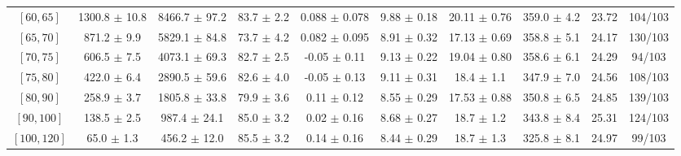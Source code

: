 \begin{tabular}{c||c|c|c|c|c|c|c||c|c}
$[60, 65]$ & 1300.8 $\pm$ 10.8 & 8466.7 $\pm$ 97.2 & 83.7 $\pm$ 2.2 & 0.088 $\pm$ 0.078 & 9.88 $\pm$ 0.18 & 20.11 $\pm$ 0.76 & 359.0 $\pm$ 4.2 & 23.72 & 104/103\\
$[65, 70]$ & 871.2 $\pm$ 9.9 & 5829.1 $\pm$ 84.8 & 73.7 $\pm$ 4.2 & 0.082 $\pm$ 0.095 & 8.91 $\pm$ 0.32 & 17.13 $\pm$ 0.69 & 358.8 $\pm$ 5.1 & 24.17 & 130/103\\
$[70, 75]$ & 606.5 $\pm$ 7.5 & 4073.1 $\pm$ 69.3 & 82.7 $\pm$ 2.5 & -0.05 $\pm$ 0.11 & 9.13 $\pm$ 0.22 & 19.04 $\pm$ 0.80 & 358.6 $\pm$ 6.1 & 24.29 & 94/103\\
$[75, 80]$ & 422.0 $\pm$ 6.4 & 2890.5 $\pm$ 59.6 & 82.6 $\pm$ 4.0 & -0.05 $\pm$ 0.13 & 9.11 $\pm$ 0.31 & 18.4 $\pm$ 1.1 & 347.9 $\pm$ 7.0 & 24.56 & 108/103\\
$[80, 90]$ & 258.9 $\pm$ 3.7 & 1805.8 $\pm$ 33.8 & 79.9 $\pm$ 3.6 & 0.11 $\pm$ 0.12 & 8.55 $\pm$ 0.29 & 17.53 $\pm$ 0.88 & 350.8 $\pm$ 6.5 & 24.85 & 139/103\\
$[90, 100]$ & 138.5 $\pm$ 2.5 & 987.4 $\pm$ 24.1 & 85.0 $\pm$ 3.2 & 0.02 $\pm$ 0.16 & 8.68 $\pm$ 0.27 & 18.7 $\pm$ 1.2 & 343.8 $\pm$ 8.4 & 25.31 & 124/103\\
$[100, 120]$ & 65.0 $\pm$ 1.3 & 456.2 $\pm$ 12.0 & 85.5 $\pm$ 3.2 & 0.14 $\pm$ 0.16 & 8.44 $\pm$ 0.29 & 18.7 $\pm$ 1.3 & 325.8 $\pm$ 8.1 & 24.97 & 99/103\\
\end{tabular}
